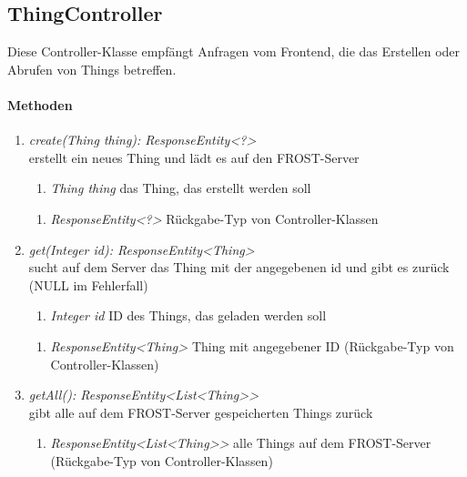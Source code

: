 \subsection{ThingController}
Diese Controller-Klasse empfängt Anfragen vom Frontend, die das Erstellen oder Abrufen von Things betreffen.

\paragraph{Methoden}

\begin{enumerate}[+]
	\item \textit{ create(Thing thing): ResponseEntity<?> }\\
	erstellt ein neues Thing und lädt es auf den FROST-Server
	
	\begin{enumerate}[$\bullet$]
		\item \textit{Thing thing} das Thing, das erstellt werden soll
		
	\end{enumerate}
	\vspace{-0.2cm}
	\begin{enumerate}[$\circ$]
		\item \textit{ResponseEntity<?>} Rückgabe-Typ von Controller-Klassen
	\end{enumerate}
	
	\item \textit{ get(Integer id): ResponseEntity<Thing> }\\
	sucht auf dem Server das Thing mit der angegebenen id und gibt es zurück (NULL im Fehlerfall)
	
	\begin{enumerate}[$\bullet$]
		\item \textit{Integer id} ID des Things, das geladen werden soll
		
	\end{enumerate}
	\vspace{-0.2cm}
	\begin{enumerate}[$\circ$]
		\item \textit{ResponseEntity<Thing>} Thing mit angegebener ID (Rückgabe-Typ von Controller-Klassen)
	\end{enumerate}
	\item \textit{ getAll(): ResponseEntity<List<Thing>> }\\
	gibt alle auf dem FROST-Server gespeicherten Things zurück
	
	\begin{enumerate}[$\circ$]
		\item \textit{ResponseEntity<List<Thing>>} alle Things auf dem FROST-Server (Rückgabe-Typ von Controller-Klassen)
	\end{enumerate}
	
	
\end{enumerate}